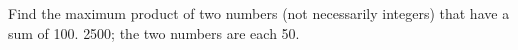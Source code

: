 {Find the maximum product of two numbers (not necessarily integers) that have a sum of 100.
}
{2500; the two numbers are each 50. 
}


